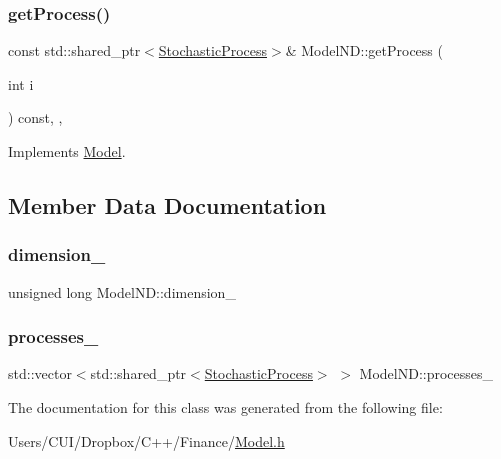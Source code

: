 \subsubsection{\texorpdfstring{get\+Process()}{getProcess()}\hspace{0.1cm}{\footnotesize\ttfamily [2/2]}}
{\footnotesize\ttfamily const std\+::shared\+\_\+ptr$<$\hyperlink{class_stochastic_process}{Stochastic\+Process}$>$\& Model\+N\+D\+::get\+Process (\begin{DoxyParamCaption}\item[{int}]{i }\end{DoxyParamCaption}) const\hspace{0.3cm}{\ttfamily [inline]}, {\ttfamily [override]}, {\ttfamily [virtual]}}



Implements \hyperlink{class_model_a23adaaf21b2955a1f4d4893ad9b77f02}{Model}.



\subsection{Member Data Documentation}
\hypertarget{class_model_n_d_ac86872437daeeffeb8fb1b387bea28f8}{}\label{class_model_n_d_ac86872437daeeffeb8fb1b387bea28f8} 
\subsubsection{\texorpdfstring{dimension\+\_\+}{dimension\_}}
{\footnotesize\ttfamily unsigned long Model\+N\+D\+::dimension\+\_\+\hspace{0.3cm}{\ttfamily [protected]}}

\hypertarget{class_model_n_d_a9cb778073c54caae0ffea17a59a9a2f9}{}\label{class_model_n_d_a9cb778073c54caae0ffea17a59a9a2f9} 
\subsubsection{\texorpdfstring{processes\+\_\+}{processes\_}}
{\footnotesize\ttfamily std\+::vector$<$std\+::shared\+\_\+ptr$<$\hyperlink{class_stochastic_process}{Stochastic\+Process}$>$ $>$ Model\+N\+D\+::processes\+\_\+\hspace{0.3cm}{\ttfamily [protected]}}



The documentation for this class was generated from the following file\+:\begin{DoxyCompactItemize}
\item 
Users/\+C\+U\+I/\+Dropbox/\+C++/\+Finance/\hyperlink{_model_8h}{Model.\+h}\end{DoxyCompactItemize}
